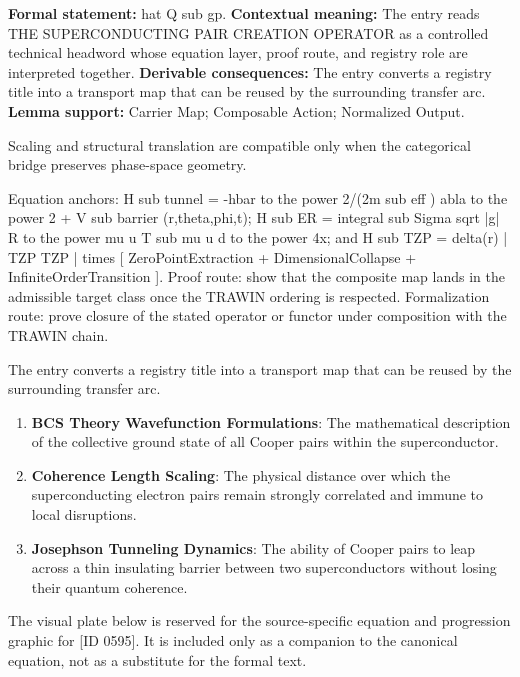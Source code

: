 \begingroup\footnotesize\setlength{\emergencystretch}{3em}\sloppy
\textbf{Formal statement:} hat Q sub gp. \textbf{Contextual meaning:} The entry reads THE SUPERCONDUCTING PAIR CREATION OPERATOR as a controlled technical headword whose equation layer, proof route, and registry role are interpreted together. \textbf{Derivable consequences:} The entry converts a registry title into a transport map that can be reused by the surrounding transfer arc. \textbf{Lemma support:} Carrier Map; Composable Action; Normalized Output.\par
\endgroup

Scaling and structural translation are compatible only when the categorical bridge preserves phase-space geometry.

Equation anchors: H sub tunnel = -hbar to the power 2/(2m sub eff ) abla to the power 2 + V sub barrier (r,theta,phi,t); H sub ER = integral sub Sigma sqrt |g| R to the power mu u T sub mu u d to the power 4x; and H sub TZP = delta(r) | TZP TZP | times [ ZeroPointExtraction + DimensionalCollapse + InfiniteOrderTransition ]. Proof route: show that the composite map lands in the admissible target class once the TRAWIN ordering is respected. Formalization route: prove closure of the stated operator or functor under composition with the TRAWIN chain.

The entry converts a registry title into a transport map that can be reused by the surrounding transfer arc.
\endgroup

\begin{enumerate}[leftmargin=1.6em,itemsep=6pt,topsep=4pt]
\item \textbf{BCS Theory Wavefunction Formulations}: The mathematical description of the collective ground state of all Cooper pairs within the superconductor.
\item \textbf{Coherence Length Scaling}: The physical distance over which the superconducting electron pairs remain strongly correlated and immune to local disruptions.
\item \textbf{Josephson Tunneling Dynamics}: The ability of Cooper pairs to leap across a thin insulating barrier between two superconductors without losing their quantum coherence.
\end{enumerate}

\begingroup\footnotesize\sloppy
The visual plate below is reserved for the source-specific equation and progression graphic for [ID 0595]. It is included only as a companion to the canonical equation, not as a substitute for the formal text.
\par\endgroup
\ifTZPDarkEdition
{}
\fi

